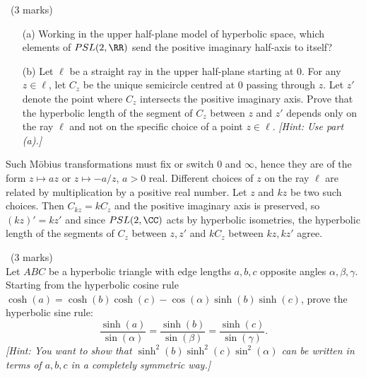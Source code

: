 \documentclass[12pt]{article}
\begin{document}
\newpage

\begin{question}\ (3 marks)\\
\begin{enumerate}
\item[(a)]  Working in the upper half-plane model of hyperbolic space, which elements of $PSL(2,\RR)$ send the positive imaginary half-axis to itself?

\item[(b)]  Let $\ell$ be a straight ray in the upper half-plane starting at $0$. For any $z\in\ell$, let $C_z$ be the unique semicircle centred at 0 passing through $z$. Let $z'$ denote the point where $C_z$ intersects the positive imaginary axis. Prove that the hyperbolic length of the segment of $C_z$ between $z$ and $z'$ depends only on the ray $\ell$ and not on the specific choice of a point $z\in\ell$. {\em [Hint: Use part (a).]}
\end{enumerate}
\end{question}

\begin{answer}
  Such M\"obius transformations must fix or switch $0$ and $\infty$, hence they are of the form $z\mapsto az$ or $z\mapsto -a/z$, $a>0$ real. Different choices of $z$ on the ray $\ell$ are related by multiplication by a positive real number. Let $z$ and $kz$ be two such choices. Then $C_{kz}=kC_z$ and the positive imaginary axis is preserved, so $(kz)'=kz'$ and since $PSL(2,\CC)$ acts by hyperbolic isometries, the hyperbolic length of the segments of $C_z$ between $z,z'$ and $kC_z$ between $kz,kz'$ agree.
\end{answer}
\newpage

\vspace{1cm}

\begin{question}\ (3 marks)\\
  Let $ABC$ be a hyperbolic triangle with edge lengths $a,b,c$ opposite angles $\alpha,\beta,\gamma$. Starting from the hyperbolic cosine rule $\cosh(a)=\cosh(b)\cosh(c)-\cos(\alpha)\sinh(b)\sinh(c)$, prove the hyperbolic sine rule:
  \[\frac{\sinh(a)}{\sin(\alpha)}=\frac{\sinh(b)}{\sin(\beta)}=\frac{\sinh(c)}{\sin(\gamma)}.\]
  {\em [Hint: You want to show that $\sinh^2(b)\sinh^2(c)\sin^2(\alpha)$ can be written in terms of $a,b,c$ in a completely symmetric way.]}
\end{question}
\end{document}
